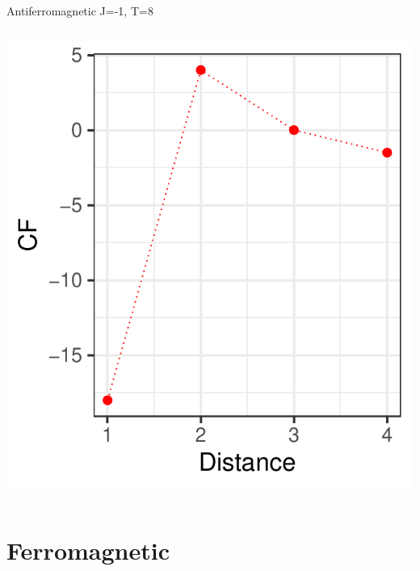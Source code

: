 \documentclass{beamer}
\begin{document}
\begin{frame}{Antiferromagnetic J=-1, T=8}
\begin{columns}
\begin{column}{0.5\textwidth}
\begin{center}
     \includegraphics[width=\textwidth]{Pic/J-1_60_2500_T=8_CORRELATION.pdf}
     \end{center}
\end{column}
\end{columns}
\end{frame}

\section{Ferromagnetic}
\end{document}
